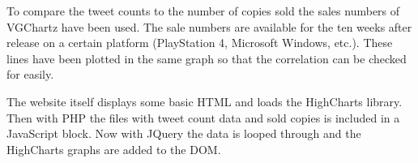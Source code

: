 To compare the tweet counts to the number of copies sold the sales numbers of VGChartz have been used. The sale numbers are available for the ten weeks after release on a certain platform (PlayStation 4, Microsoft Windows, etc.). These lines have been plotted in the same graph so that the correlation can be checked for easily.

The website itself displays some basic HTML and loads the HighCharts library. Then with PHP the files with tweet count data and sold copies is included in a JavaScript block. Now with JQuery the data is looped through and the HighCharts graphs are added to the DOM.